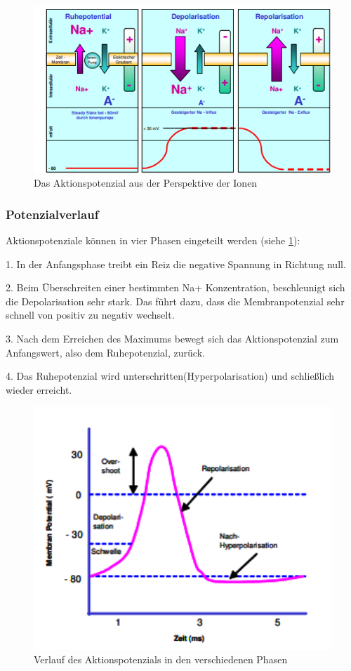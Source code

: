 \begin{figure}[H]
  \includegraphics[width= \linewidth]
{Aktionspotenzial3.png}
  \caption{Das Aktionspotenzial aus der Perspektive der Ionen \cite{KonEMG2006-ATO}}
  \label{fig:AP3}
\end{figure}


\subsubsection{Potenzialverlauf}
Aktionspotenziale können in vier Phasen eingeteilt werden  (siehe \ref{fig:AP3}):


1. In der Anfangsphase treibt ein Reiz die negative Spannung in Richtung null.

2. Beim Überschreiten einer bestimmten Na+ Konzentration, beschleunigt sich die Depolarisation sehr stark. Das führt dazu, dass die Membranpotenzial sehr schnell von positiv zu negativ wechselt. 

3. Nach dem Erreichen des Maximums bewegt sich das Aktionspotenzial zum Anfangswert, also dem Ruhepotenzial, zurück.

4. Das Ruhepotenzial wird unterschritten(Hyperpolarisation) und schließlich wieder erreicht. \cite{KonEMG2006-ATO}

\begin{figure}[H]
  \centering
  \includegraphics[width=120mm,scale=0.7]{Aktionspotenzial.png}
  \caption{Verlauf des  Aktionspotenzials in den verschiedenen Phasen \cite{KonEMG2006-ATO}}
  \label{fig:AP1}
\end{figure}


